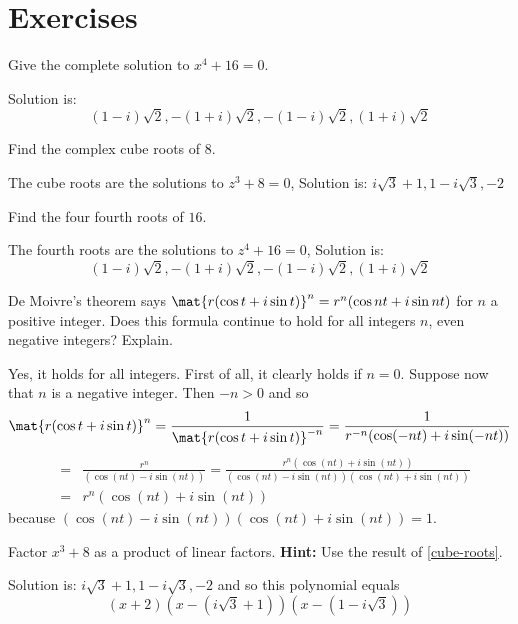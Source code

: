\section*{Exercises}

\begin{ex} Give the complete solution to $x^{4}+16=0$.
\begin{sol}
 Solution is:
\[
(1-i) \sqrt{2},-(1+i) \sqrt{2},-(1-i)
\sqrt{2},(1+i) \sqrt{2}
\]
\end{sol}
\end{ex}

\begin{ex} \label{cube-roots} Find the complex cube roots of $8$.
\begin{sol}
The cube roots are the solutions to $%
z^{3}+8=0$, Solution is: $i\sqrt{3} +1,1-i\sqrt{3},-2$
\end{sol}
\end{ex}

\begin{ex} \label{cube-roots2} Find the four fourth roots of $16$.
\begin{sol}
The fourth roots are
the solutions to $z^{4}+16=0$, Solution is:
\[
(1-i) \sqrt{2},-(1+i) \sqrt{2},-(1-i)
\sqrt{2},(1+i)\sqrt{2}
\]
\end{sol}
\end{ex}

\begin{ex} \label{exer-complex1}De Moivre's theorem says $\mat{r(\cos
t+i\sin t)} ^{n}=r^{n}(\cos nt+i\sin nt) $ for $n$
a positive integer. Does this formula continue to hold for all integers $n$,
even negative integers? Explain.
\begin{sol}
Yes, it holds for all integers. First of
all, it clearly holds if $n=0$. Suppose now that $n$ is a negative integer.
Then $-n>0$ and so
\[
\mat{r(\cos t+i\sin t)} ^{n}=\frac{1}{\mat{r(
\cos t+i\sin t)} ^{-n}}=\frac{1}{r^{-n}(\cos (
-nt) +i\sin (-nt)) }
\]
\begin{eqnarray*}
&=&\frac{r^{n}}{(\cos (nt) -i\sin (nt))
}=\frac{r^{n}(\cos (nt) +i\sin (nt)) }{
(\cos (nt) -i\sin (nt)) (\cos
(nt) +i\sin (nt)) } \\
&=&r^{n}(\cos (nt) +i\sin (nt))
\end{eqnarray*}
because $(\cos (nt) -i\sin (nt)) (
\cos (nt) +i\sin (nt)) =1$.
\end{sol}
\end{ex}

\begin{ex} Factor $x^{3}+8$ as a product of linear factors. \textbf{Hint:} Use the result of {\eqref{cube-roots}}.
\begin{sol}
Solution
is: $i\sqrt{3}+1,1-i\sqrt{3},-2$ and so this polynomial equals
\[
(x+2) (x-(i\sqrt{3}+1)) (x-(
1-i\sqrt{3}))
\]
\end{sol}
\end{ex}


